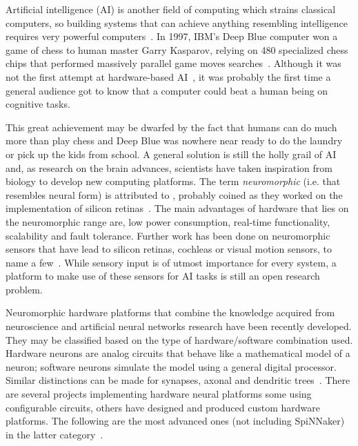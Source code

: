 Artificial intelligence (AI) is another field of computing which strains classical computers, so building systems that can achieve anything resembling intelligence requires very powerful computers~\cite{to-build-a-brain-6247562}. In 1997, IBM's Deep Blue computer won a game of chess to human master Garry Kasparov, relying on 480 specialized chess chips that performed massively parallel game moves searches~\cite{deep-blue-Campbell200257}. Although it was not the first attempt at hardware-based AI~\cite{indiveri2011frontiers}, it was probably the first time a general audience got to know that a computer could beat a human being on cognitive tasks. 

This great achievement may be dwarfed by the fact that humans can do much more than play chess and Deep Blue was nowhere near ready to do the laundry or pick up the kids from school. A general solution is still the holly grail of AI and, as research on the brain advances, scientists have taken inspiration from biology to develop new computing platforms. 
The term \emph{neuromorphic} (i.e. that resembles neural form) is attributed to \citeauthor{mead2012analog}, probably coined as they worked on the implementation of silicon retinas~\cite{carver-mead,mead2012analog}. The main advantages of hardware that lies on the neuromorphic range are, low power consumption, real-time functionality, scalability and fault tolerance. Further work has been done on neuromorphic sensors that have lead to silicon retinas, cochleas or visual motion sensors, to name a few~\cite{liu2010neuromorphic}. While sensory input is of utmost importance for every system, a platform to make use of these sensors for AI tasks is still an open research problem. 


Neuromorphic hardware platforms that combine the knowledge acquired from neuroscience and artificial neural networks research have been recently developed. They may be classified based on the type of hardware/software combination used. Hardware neurons are analog circuits that behave like a mathematical model of a neuron; software neurons simulate the model using a general digital processor. Similar distinctions can be made for synapses, axonal and dendritic trees~\cite{misra2010artificial}. There are several projects implementing hardware neural platforms some using configurable circuits, others have designed and produced custom hardware platforms. The following are the most advanced ones (not including SpiNNaker) in the latter category~\cite{neuro-platforms-summary-7159144}.

